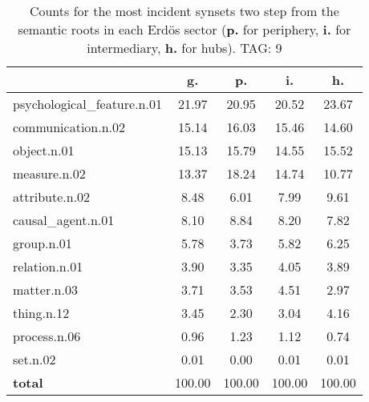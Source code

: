 \begin{table}[h!]
\begin{center}
\begin{tabular}{| l || c | c | c | c |}\hline
 & {\bf g.} & {\bf p.} & {\bf i.} & {\bf h.} \\\hline\hline
psychological\_feature.n.01 & 21.97  & 20.95  & 20.52  & 23.67 \\\hline
communication.n.02 & 15.14  & 16.03  & 15.46  & 14.60 \\\hline
object.n.01 & 15.13  & 15.79  & 14.55  & 15.52 \\\hline
measure.n.02 & 13.37  & 18.24  & 14.74  & 10.77 \\\hline
attribute.n.02 & 8.48  & 6.01  & 7.99  & 9.61 \\\hline
causal\_agent.n.01 & 8.10  & 8.84  & 8.20  & 7.82 \\\hline
group.n.01 & 5.78  & 3.73  & 5.82  & 6.25 \\\hline
relation.n.01 & 3.90  & 3.35  & 4.05  & 3.89 \\\hline
matter.n.03 & 3.71  & 3.53  & 4.51  & 2.97 \\\hline
thing.n.12 & 3.45  & 2.30  & 3.04  & 4.16 \\\hline
process.n.06 & 0.96  & 1.23  & 1.12  & 0.74 \\\hline
set.n.02 & 0.01  & 0.00  & 0.01  & 0.01 \\\hline\hline
{{\bf total}} & 100.00  & 100.00  & 100.00  & 100.00 \\\hline
\end{tabular}
\caption{Counts for the most incident synsets two step from the semantic roots in each Erd\"os sector ({\bf p.} for periphery, {\bf i.} for intermediary, {\bf h.} for hubs). TAG: 9}
\end{center}
\end{table}